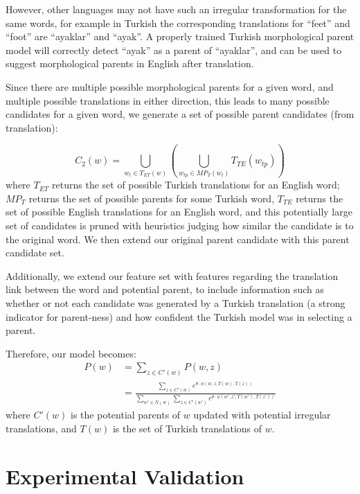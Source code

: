 \documentclass[11pt,twocolumn]{article}
\begin{document}
However, other languages may not have such an irregular transformation
for the same words, for example in Turkish the corresponding translations
for ``feet'' and ``foot'' are ``ayaklar'' and ``ayak''. A properly trained Turkish
morphological parent model will correctly detect ``ayak'' as a parent of ``ayaklar'',
and can be used to suggest morphological parents in English after translation.

Since there are multiple possible morphological parents for a given word, and multiple
possible translations in either direction, this leads to many possible candidates for a given word,
we generate a set of possible parent candidates (from translation):

\begin{equation}
    C_2(w) = \bigcup_{w_t \in T_{ET}(w)}\left(\bigcup_{w_{tp} \in MP_T (w_t)} T_{TE}(w_{tp})\right)
\end{equation}
where $T_{ET}$ returns the set of possible Turkish translations
for an English word; $MP_T$ returns the set of possible parents for some Turkish word,
$T_{TE}$ returns the set of possible English translations for an English word,
and this potentially large set of candidates is pruned with heuristics judging
how similar the candidate is to the original word. We then extend our original parent candidate
with this parent candidate set.

Additionally, we extend our feature set with features regarding the translation link between
the word and potential parent, to include information such as whether or not each candidate was
generated by a Turkish translation (a strong indicator for parent-ness) and how confident
the Turkish model was in selecting a parent.

Therefore, our model becomes:
\begin{equation}
    \begin{split}
        P(w) &= \sum_{z \in C'(w)} P(w,z) \\
             &= \frac{\sum_{z \in C'(w)} e^{\theta \cdot \phi(w, z, T(w), T(z))}}{\sum_{w' \in N(w)} \sum_{z \in C'(w')} e^{\theta \cdot \phi(w', z', T(w'), T(z'))}}
    \end{split}
\end{equation}
where $C'(w)$ is the potential parents of $w$ updated with potential irregular translations,
and $T(w)$ is the set of Turkish translations of $w$.

\section{Experimental Validation}
\end{document}
